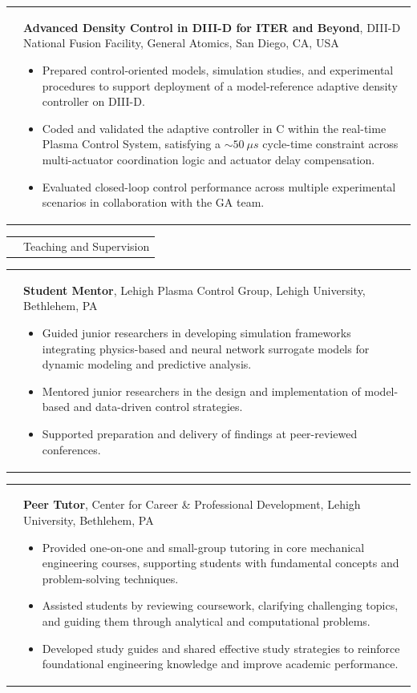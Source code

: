\documentclass[11pt,letterpaper]{article}
\makeatletter
\newcommand{\CVSection}[1]{%
  \vspace{0.4em}
  \noindent
  \begin{tabularx}{\textwidth}{@{}p{0.82in}@{\hspace{0.14in}}X@{}}
    \raisebox{-1.45ex}{\color{rulecolor}\rule{0.82in}{4.2pt}} &
    {\fontsize{14}{16}\selectfont\color{cvcolor}#1}\\
  \end{tabularx}
  \vspace{0.55em}
}
\newcommand{\CVItem}[2]{%
  \begin{tabularx}{\textwidth}{@{}p{0.83in}@{\hspace{0.15in}}X@{}}
    \raggedleft{#1} & #2\\[3pt]
  \end{tabularx}
}
\makeatother
\begin{document}
\CVItem{\vspace{-2.75mm}June 2025}{\textbf{Advanced Density Control in DIII-D for ITER and Beyond}, DIII-D National Fusion Facility, General Atomics, San Diego, CA, USA
  \begin{itemize}
     \item Prepared control-oriented models, simulation studies, and experimental procedures to support deployment of a model-reference adaptive density controller on DIII-D.
     \item Coded and validated the adaptive controller in C within the real-time Plasma Control System, satisfying a ${\sim}50~\mu s$ cycle-time constraint across multi-actuator coordination logic and actuator delay compensation.
     \item Evaluated closed-loop control performance across multiple experimental scenarios in collaboration with the GA team.
  \end{itemize}
}
\CVSection{Teaching and Supervision}

\CVItem{\hspace{-5mm}\mbox{2021--Ongoing}}{\textbf{Student Mentor}, Lehigh Plasma Control Group, Lehigh University, Bethlehem, PA \begin{itemize}
  \item Guided junior researchers in developing simulation frameworks integrating physics-based and neural network surrogate models for dynamic modeling and predictive analysis.
\item Mentored junior researchers in the design and implementation of model-based and data-driven control strategies.
\item Supported preparation and delivery of findings at peer-reviewed conferences.
\end{itemize}}

\CVItem{\hspace{-5mm}\mbox{2018--2021}}{\textbf{Peer Tutor}, Center for Career \& Professional Development, Lehigh University, Bethlehem, PA \begin{itemize}
  \item Provided one-on-one and small-group tutoring in core mechanical engineering courses, supporting students with fundamental concepts and problem-solving techniques.
  \item Assisted students by reviewing coursework, clarifying challenging topics, and guiding them through analytical and computational problems.
  \item Developed study guides and shared effective study strategies to reinforce foundational engineering knowledge and improve academic performance.
\end{itemize}}
\end{document}
